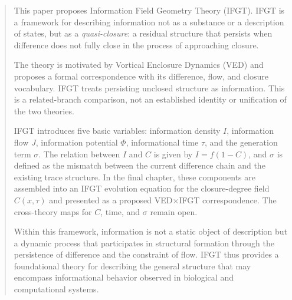 \begin{abstract}
This paper proposes Information Field Geometry Theory (IFGT). IFGT is a framework for describing information not as a substance or a description of states, but as a \emph{quasi-closure}: a residual structure that persists when difference does not fully close in the process of approaching closure.

The theory is motivated by Vortical Enclosure Dynamics (VED) and proposes a
formal correspondence with its difference, flow, and closure vocabulary.
IFGT treats persisting unclosed structure as information.  This is a
related-branch comparison, not an established identity or unification of the
two theories.

IFGT introduces five basic variables: information density $I$, information flow $J$, information potential $\Phi$, informational time $\tau$, and the generation term $\sigma$. The relation between $I$ and $C$ is given by $I = f(1 - C)$, and $\sigma$ is defined as the mismatch between the current difference chain and the existing trace structure. In the final chapter, these components are assembled into an IFGT evolution equation for the closure-degree field $C(x,\tau)$ and presented as a proposed VED$\times$IFGT correspondence. The cross-theory maps for $C$, time, and $\sigma$ remain open.

Within this framework, information is not a static object of description but a dynamic process that participates in structural formation through the persistence of difference and the constraint of flow. IFGT thus provides a foundational theory for describing the general structure that may encompass informational behavior observed in biological and computational systems.
\end{abstract}
